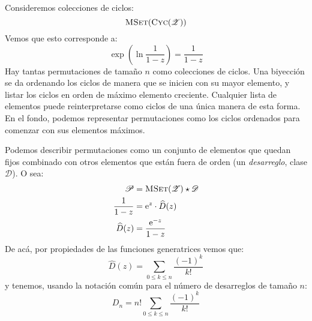   Consideremos colecciones de ciclos:
  \begin{equation*}
    \operatorname{\textsc{MSet}}(\operatorname{\textsc{Cyc}}(\mathscr{Z}))
  \end{equation*}
  Vemos que esto corresponde a:
  \begin{equation*}
    \exp\left( \ln \frac{1}{1 - z} \right)
      = \frac{1}{1 - z}
  \end{equation*}
  Hay tantas permutaciones de tamaño \(n\) como colecciones de ciclos.
  Una biyección se da ordenando los ciclos
  de manera que se inicien con su mayor elemento,
  y listar los ciclos en orden de máximo elemento creciente.
  Cualquier lista de elementos puede reinterpretarse como ciclos
  de una única manera de esta forma.
  En el fondo,
  podemos representar permutaciones
  como los ciclos ordenados para comenzar con sus elementos máximos.

  Podemos describir permutaciones
  como un conjunto de elementos que quedan fijos
  combinado con otros elementos que están fuera de orden
  (un \emph{desarreglo},
   clase \(\mathscr{D}\)).
  O sea:
  \begin{align*}
    \mathscr{P}
      &= \operatorname{\textsc{MSet}}(\mathscr{Z}) \star \mathscr{D} \\
    \frac{1}{1 - z}
      &= \mathrm{e}^z \cdot \widehat{D}(z) \\
    \widehat{D}(z)
      &= \frac{\mathrm{e}^{-z}}{1 - z}
  \end{align*}
  De acá,
  por propiedades de las funciones generatrices vemos que:
  \begin{equation*}
    [z^n] \widehat{D}(z)
      = \sum_{0 \le k \le n} \frac{(-1)^k}{k!}
  \end{equation*}
  y tenemos,
  usando la notación común para el número de desarreglos de tamaño \(n\):
  \begin{equation*}
    D_n
      = n! \sum_{0 \le k \le n} \frac{(-1)^k}{k!}
  \end{equation*}

